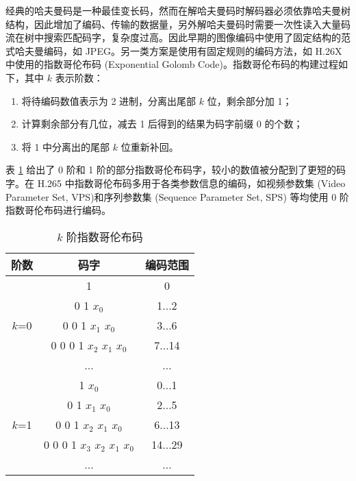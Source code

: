 经典的哈夫曼码是一种最佳变长码，然而在解哈夫曼码时解码器必须依靠哈夫曼树结构，因此增加了编码、传输的数据量，另外解哈夫曼码时需要一次性读入大量码流在树中搜索匹配码字，复杂度过高。因此早期的图像编码中使用了固定结构的范式哈夫曼编码，如 JPEG。另一类方案是使用有固定规则的编码方法，如 H.26X 中使用的指数哥伦布码 (Exponential Golomb Code)。指数哥伦布码的构建过程如下，其中 $k$ 表示阶数：
\begin{enumerate}
    \item 将待编码数值表示为 2 进制，分离出尾部 $k$ 位，剩余部分加 1；
    \item 计算剩余部分有几位，减去 1 后得到的结果为码字前缀 0 的个数；
    \item 将 1 中分离出的尾部 $k$ 位重新补回。
\end{enumerate}
表 \ref{tab:ExpColombCode} 给出了 0 阶和 1 阶的部分指数哥伦布码字，较小的数值被分配到了更短的码字。在 H.265 中指数哥伦布码多用于各类参数信息的编码，如视频参数集 (Video Parameter Set, VPS)和序列参数集 (Sequence Parameter Set, SPS) 等均使用 0 阶指数哥伦布码进行编码。
\begin{table}[hbtp]
    \centering
    \caption{$k$ 阶指数哥伦布码}
    \label{tab:ExpColombCode}
    \begin{tabular}{@{}ccc@{}}
        \toprule
        \textbf{阶数}          & \textbf{码字}                     & \textbf{编码范围} \\ \midrule
        \multirow{5}{*}{$k$=0} & 1                                 & 0                 \\
                               & 0 1 $x_0$                         & 1...2             \\
                               & 0 0 1 $x_1$ $x_0$                 & 3...6             \\
                               & 0 0 0 1 $x_2$ $x_1$ $x_0$         & 7...14            \\
                               & ...                               & ...               \\
        \multirow{5}{*}{$k$=1} & 1 $x_0$                           & 0...1             \\
                               & 0 1 $x_1$ $x_0$                   & 2...5             \\
                               & 0 0 1 $x_2$ $x_1$ $x_0$           & 6...13            \\
                               & 0 0 0 1 $x_3$ $x_2$ $x_1$   $x_0$ & 14...29           \\
                               & ...                               & ...               \\ \bottomrule
    \end{tabular}
\end{table}

